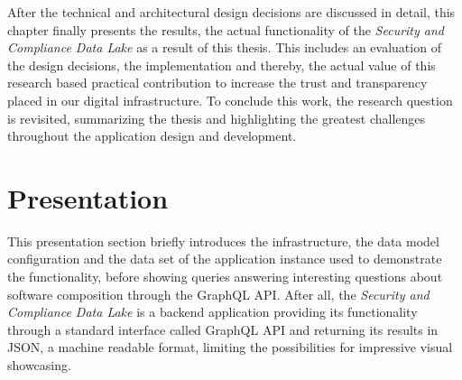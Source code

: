 
After the technical and architectural design decisions are discussed in detail, this chapter finally presents the results, the actual functionality of the \emph{Security and Compliance Data Lake} as a result of this thesis. This includes an evaluation of the design decisions, the implementation and thereby, the actual value of this research based practical contribution to increase the trust and transparency placed in our digital infrastructure. To conclude this work, the research question is revisited, summarizing the thesis and highlighting the greatest challenges throughout the application design and development. 

\section{Presentation} \label{sec:Presentation}
This presentation section briefly introduces the infrastructure, the data model configuration and the data set of the application instance used to demonstrate the functionality, before showing queries answering interesting questions about software composition through the GraphQL API. After all, the \emph{Security and Compliance Data Lake} is a backend application providing its functionality through a standard interface called GraphQL API and returning its results in JSON, a machine readable format, limiting the possibilities for impressive visual showcasing.   

